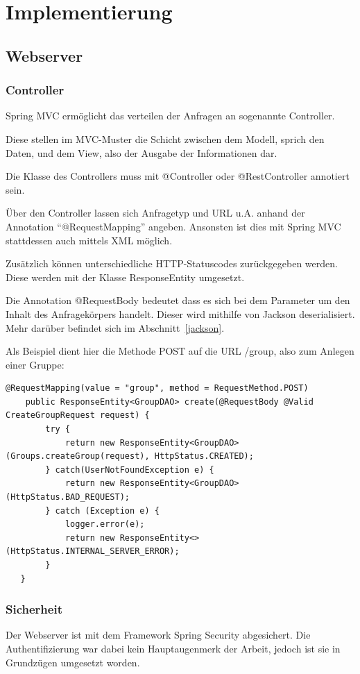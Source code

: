 \section{Implementierung}\label{kapitel6}
\subsection{Webserver}
\subsubsection{Controller}
Spring MVC ermöglicht das verteilen der Anfragen an sogenannte Controller.

Diese stellen im MVC-Muster die Schicht zwischen dem Modell, sprich den Daten, und dem View, also der Ausgabe der Informationen dar.

Die Klasse des Controllers muss mit @Controller oder @RestController annotiert sein.

Über den Controller lassen sich Anfragetyp und URL u.A. anhand der Annotation ``@RequestMapping'' angeben. Ansonsten ist dies mit Spring MVC stattdessen auch mittels XML möglich.

Zusätzlich können unterschiedliche HTTP-Statuscodes zurückgegeben werden. Diese werden mit der Klasse ResponseEntity umgesetzt.

Die Annotation @RequestBody bedeutet dass es sich bei dem Parameter um den Inhalt des Anfragekörpers handelt. Dieser wird mithilfe von Jackson deserialisiert. Mehr darüber befindet sich im Abschnitt~\ref{jackson}.

Als Beispiel dient hier die Methode POST auf die URL /group, also zum Anlegen einer Gruppe:
\lstset{language=java}
\begin{lstlisting}[frame=htrbl, caption={Controller zum Erstellen einer Gruppe}, breaklines=true]
@RequestMapping(value = "group", method = RequestMethod.POST)
    public ResponseEntity<GroupDAO> create(@RequestBody @Valid CreateGroupRequest request) {
        try {
            return new ResponseEntity<GroupDAO>(Groups.createGroup(request), HttpStatus.CREATED);
        } catch(UserNotFoundException e) {
            return new ResponseEntity<GroupDAO>(HttpStatus.BAD_REQUEST);
        } catch (Exception e) {
            logger.error(e);
            return new ResponseEntity<>(HttpStatus.INTERNAL_SERVER_ERROR);
        }
   }
\end{lstlisting}
\subsubsection{Sicherheit}\label{sicherheit}
Der Webserver ist mit dem Framework Spring Security abgesichert. Die Authentifizierung war dabei kein Hauptaugenmerk der Arbeit, jedoch ist sie in Grundzügen umgesetzt worden. 

